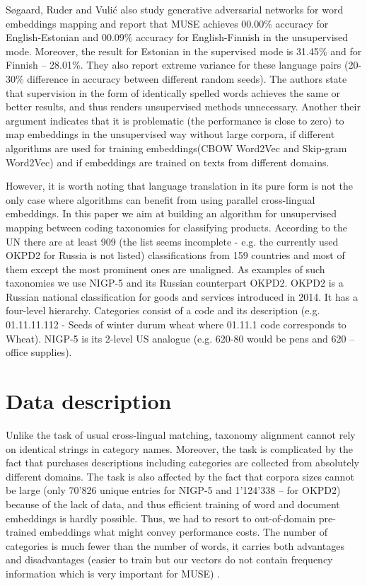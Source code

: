 \documentclass[11pt,a4paper]{article}
\begin{document}
Søgaard, Ruder and Vulić \cite{ruder-muse-limitations} also study generative adversarial networks for word embeddings mapping and report that MUSE achieves 00.00\% accuracy for English-Estonian and 00.09\% accuracy for English-Finnish in the unsupervised mode. Moreover, the result for Estonian in the supervised mode is 31.45\% and for Finnish -- 28.01\%. They also report extreme variance for these language pairs (20-30\% difference in accuracy between different random seeds). The authors state that supervision in the form of identically spelled words achieves the same or better results, and thus renders unsupervised methods unnecessary. Another their argument indicates that it is problematic (the performance is close to zero) to map embeddings in the unsupervised way without large corpora, if different algorithms are used for training embeddings(CBOW Word2Vec and Skip-gram Word2Vec) and if embeddings are trained on texts from different domains.

However, it is worth noting that language translation in its pure form is not the only case where algorithms can benefit from using parallel cross-lingual embeddings. In this paper we aim at building an algorithm for unsupervised mapping between coding taxonomies for classifying products. According to the UN \cite{unsd} there are at least 909 (the list seems incomplete - e.g. the currently used OKPD2 for Russia is not listed) classifications from 159 countries and most of them except the most prominent ones are unaligned. As examples of such taxonomies we use NIGP-5 and its Russian counterpart OKPD2. OKPD2 is a Russian national classification for goods and services introduced in 2014. It has a four-level hierarchy. Categories consist of a code and its description (e.g. 01.11.11.112 - Seeds of winter durum wheat where 01.11.1 code corresponds to Wheat). NIGP-5 is its 2-level US analogue (e.g. 620-80 would be pens and 620 -- office supplies).


\section{Data description}


Unlike the task of usual cross-lingual matching, taxonomy alignment cannot rely on identical strings in category names. Moreover, the task is complicated by the fact that purchases descriptions including categories are collected from absolutely different domains. The task is also affected by the fact that corpora sizes cannot be large (only 70'826 unique entries for NIGP-5 and 1'124'338 -- for OKPD2) because of the lack of data, and thus efficient training of word and document embeddings is hardly possible. Thus, we had to resort to out-of-domain pre-trained embeddings what might convey performance costs. The number of categories is much fewer than the number of words, it carries both advantages and disadvantages (easier to train but our vectors do not contain frequency information which is very important for MUSE) \cite{ruder-muse-limitations}.
\end{document}
